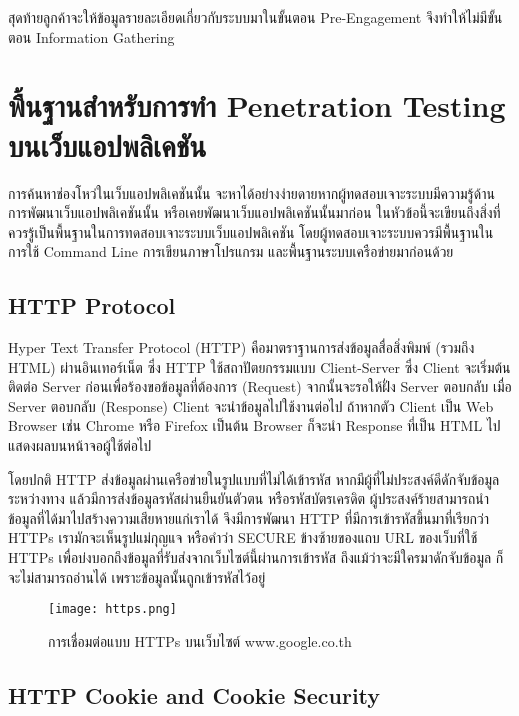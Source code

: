 สุดท้ายลูกค้าจะให้ข้อมูลรายละเอียดเกี่ยวกับระบบมาในขั้นตอน Pre-Engagement จึงทำให้ไม่มีขั้นตอน Information Gathering

\section{พื้นฐานสำหรับการทำ Penetration Testing บนเว็บแอปพลิเคชัน}

การค้นหาช่องโหว่ในเว็บแอปพลิเคชันนั้น จะหาได้อย่างง่ายดายหากผู้ทดสอบเจาะระบบมีความรู้ด้านการพัฒนาเว็บแอปพลิเคชันนั้น หรือเคยพัฒนาเว็บแอปพลิเคชันนั้นมาก่อน ในหัวข้อนี้จะเขียนถึงสิ่งที่ควรรู้เป็นพื้นฐานในการทดสอบเจาะระบบเว็บแอปพลิเคชัน โดยผู้ทดสอบเจาะระบบควรมีพื้นฐานในการใช้ Command Line การเขียนภาษาโปรแกรม และพื้นฐานระบบเครือข่ายมาก่อนด้วย

\subsection{HTTP Protocol}

Hyper Text Transfer Protocol (HTTP) คือมาตราฐานการส่งข้อมูลสื่อสิ่งพิมพ์ (รวมถึง HTML) ผ่านอินเทอร์เน็ต ซึ่ง HTTP  ใช้สถาปัตยกรรมแบบ Client-Server \cite{https://developer.mozilla.org/en-US/docs/Web/HTTP/Overview} ซึ่ง Client จะเริ่มต้นติดต่อ Server ก่อนเพื่อร้องขอข้อมูลที่ต้องการ (Request) จากนั้นจะรอให้ฝั่ง Server ตอบกลับ เมื่อ Server ตอบกลับ (Response) Client จะนำข้อมูลไปใช้งานต่อไป ถ้าหากตัว Client เป็น Web Browser เช่น Chrome หรือ Firefox เป็นต้น Browser ก็จะนำ Response ที่เป็น HTML ไปแสดงผลบนหน้าจอผู้ใช้ต่อไป \cite{https://developer.mozilla.org/en-US/docs/Web/HTTP/Messages} 

โดยปกติ HTTP ส่งข้อมูลผ่านเครือข่ายในรูปแบบที่ไม่ได้เข้ารหัส หากมีผู้ที่ไม่ประสงค์ดีดักจับข้อมูลระหว่างทาง แล้วมีการส่งข้อมูลรหัสผ่านยืนยันตัวตน หรือรหัสบัตรเครดิต ผู้ประสงค์ร้ายสามารถนำข้อมูลที่ได้มาไปสร้างความเสียหายแก่เราได้ จึงมีการพัฒนา HTTP ที่มีการเข้ารหัสขึ้นมาที่เรียกว่า HTTPs เรามักจะเห็นรูปแม่กุญแจ หรือคำว่า SECURE ข้างซ้ายของแถบ URL ของเว็บที่ใช้ HTTPs เพื่อบ่งบอกถึงข้อมูลที่รับส่งจากเว็บไซต์นี้ผ่านการเข้ารหัส ถึงแม้ว่าจะมีใครมาดักจับข้อมูล ก็จะไม่สามารถอ่านได้ เพราะข้อมูลนั้นถูกเข้ารหัสไว้อยู่

\begin{figure}[h]
	\centering
	\texttt{[image: https.png]}
	\caption{การเชื่อมต่อแบบ HTTPs บนเว็บไซต์ www.google.co.th}
	\label{Fig:https}
\end{figure}

\subsection{HTTP Cookie and Cookie Security}

